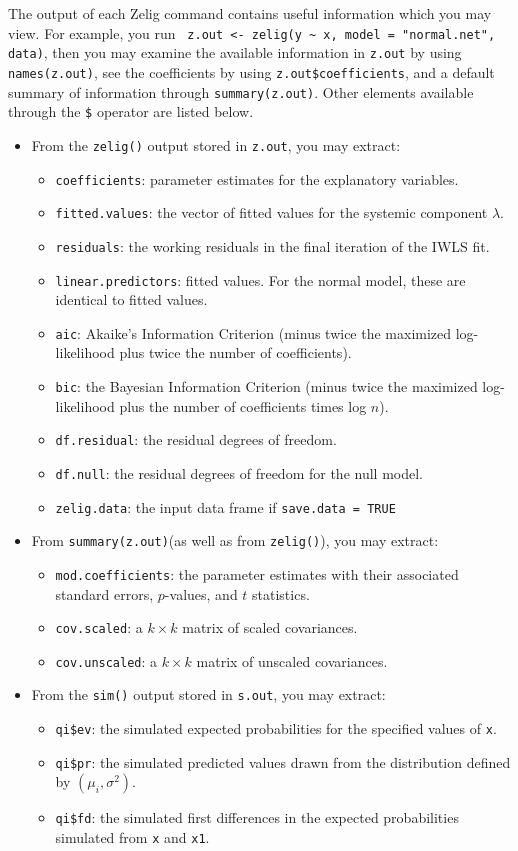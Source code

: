 The output of each Zelig command contains useful information which you may view. For example, you run \verb{ z.out <- zelig(y ~ x, model = "normal.net", data){, then you may examine the available information in {\tt z.out} by using {\tt names(z.out)}, see the coefficients by using {\tt z.out\$coefficients}, and a default summary of information through {\tt summary(z.out)}. Other elements available through the {\tt \$} operator are listed below. 
\begin{itemize}
\item From the {\tt zelig()} output stored in {\tt  z.out}, you may extract:
\begin{itemize}
\item {\tt coefficients}: parameter estimates for the explanatory variables.
\item {\tt fitted.values}: the vector of fitted values for the systemic component $\lambda$.
\item {\tt residuals}: the working residuals in the final iteration of the IWLS fit. 
\item {\tt linear.predictors}: fitted values. For the normal model, these are identical to fitted values.
\item {\tt aic}: Akaike's Information Criterion (minus twice the maximized log-likelihood plus twice the number of coefficients).
\item {\tt bic}: the Bayesian Information Criterion (minus twice the maximized log-likelihood plus the number of coefficients times log $n$).
\item {\tt df.residual}: the residual degrees of freedom.
\item {\tt df.null}: the residual degrees of freedom for the null model. 
\item {\tt zelig.data}: the input data frame if {\tt save.data = TRUE} 

\end{itemize}
\item From {\tt summary(z.out)}(as well as from {\tt zelig()}), you may extract:
\begin{itemize}
\item {\tt mod.coefficients}: the parameter estimates with their associated standard errors, $p$-values, and $t$ statistics. 
\item {\tt cov.scaled}: a $k \times k$ matrix of scaled covariances.
\item {\tt cov.unscaled}: a $k \times k$ matrix of unscaled covariances. 
\end{itemize}
\item From the {\tt sim()} output stored in {\tt s.out}, you may extract:
\begin{itemize}
\item {\tt qi\$ev}: the simulated expected probabilities for the specified values of {\tt x}.
\item {\tt qi\$pr}: the simulated predicted values drawn from the distribution defined by $(\mu_i, \sigma^2)$.
\item {\tt qi\$fd}: the simulated first differences in the expected probabilities simulated from {\tt x} and {\tt x1}.
\end{itemize}
\end{itemize}


